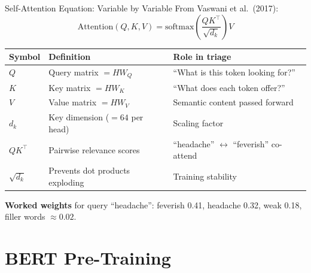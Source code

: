 \documentclass[10pt,aspectratio=169]{beamer}
\begin{document}
\begin{frame}{Self-Attention Equation: Variable by Variable}
	\small
	From Vaswani et al.\ (2017):
	\[
		\mathrm{Attention}(Q,K,V) = \mathrm{softmax}\!\left(\frac{QK^{\top}}{\sqrt{d_k}}\right)V
	\]
	\begin{tabular}{@{}p{1.5cm}p{4.5cm}p{4.8cm}@{}}
		\toprule
		\textbf{Symbol} & \textbf{Definition} & \textbf{Role in triage} \\
		\midrule
		$Q$ & Query matrix $= H W_Q$ & ``What is this token looking for?'' \\
		$K$ & Key matrix $= H W_K$ & ``What does each token offer?'' \\
		$V$ & Value matrix $= H W_V$ & Semantic content passed forward \\
		$d_k$ & Key dimension ($= 64$ per head) & Scaling factor \\
		$QK^\top$ & Pairwise relevance scores & ``headache'' $\leftrightarrow$ ``feverish'' co-attend \\
		$\sqrt{d_k}$ & Prevents dot products exploding & Training stability \\
		\bottomrule
	\end{tabular}

	\vspace{0.1cm}
	\footnotesize\textbf{Worked weights} for query ``headache'': feverish 0.41, headache 0.32, weak 0.18, filler words $\approx 0.02$.
\end{frame}

\section{BERT Pre-Training}
\end{document}
